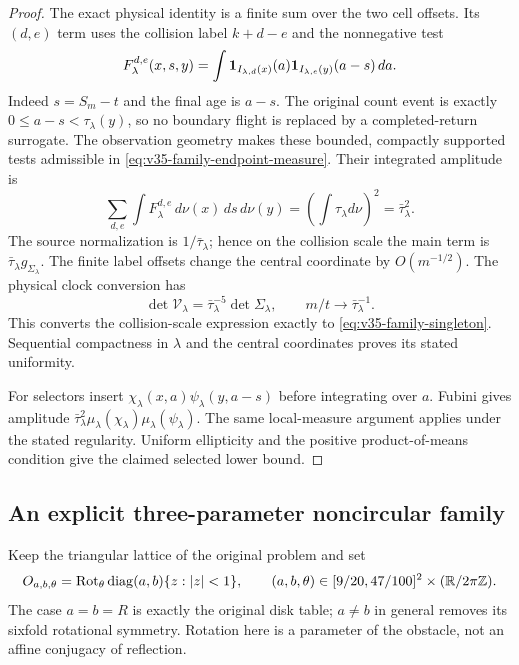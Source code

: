 \begin{proof}
The exact physical identity is a finite sum over the two cell offsets.
Its $(d,e)$ term uses the collision label $k+d-e$ and the nonnegative
test
\[
 F^{d,e}_\lambda(x,s,y)=
   \int\mathbf1_{I_{\lambda,d}(x)}(a)
             \mathbf1_{I_{\lambda,e}(y)}(a-s)\,da.
\]
Indeed $s=S_m-t$ and the final age is $a-s$. The original count event
is exactly $0\le a-s<\tau_\lambda(y)$, so no boundary flight is
replaced by a completed-return surrogate. The observation geometry
makes these bounded, compactly supported tests admissible in
\eqref{eq:v35-family-endpoint-measure}. Their integrated amplitude is
\[
 \sum_{d,e}\int F^{d,e}_\lambda\,d\nu(x)\,ds\,d\nu(y)
       =\left(\int\tau_\lambda d\nu\right)^2=\bar\tau_\lambda^2.
\]
The source normalization is $1/\bar\tau_\lambda$; hence on the collision
scale the main term is $\bar\tau_\lambda g_{\Sigma_\lambda}$.
The finite label offsets change the central coordinate by
$O(m^{-1/2})$. The physical clock conversion has
\[
 \det\mathcal V_\lambda=\bar\tau_\lambda^{-5}\det\Sigma_\lambda,
            \qquad m/t\longrightarrow\bar\tau_\lambda^{-1}.
\]
This converts the collision-scale expression exactly to
\eqref{eq:v35-family-singleton}. Sequential compactness in $\lambda$
and the central coordinates proves its stated uniformity.

For selectors insert $\chi_\lambda(x,a)\psi_\lambda(y,a-s)$ before
integrating over $a$. Fubini gives amplitude
$\bar\tau_\lambda^2\mu_\lambda(\chi_\lambda)
\mu_\lambda(\psi_\lambda)$. The same local-measure argument applies
under the stated regularity. Uniform ellipticity and the positive
product-of-means condition give the claimed selected lower bound.
\end{proof}

\subsection{An explicit three-parameter noncircular family}
Keep the triangular lattice of the original problem and set
\begin{equation}\label{eq:v35-ellipses}
 O_{a,b,\theta}=\operatorname{Rot}_\theta
       \operatorname{diag}(a,b)\{z:|z|<1\},\qquad
 (a,b,\theta)\in[9/20,47/100]^2\times(\mathbb R/2\pi\mathbb Z).
\end{equation}
The case $a=b=R$ is exactly the original disk table; $a\ne b$ in
general removes its sixfold rotational symmetry. Rotation here is a
parameter of the obstacle, not an affine conjugacy of reflection.

